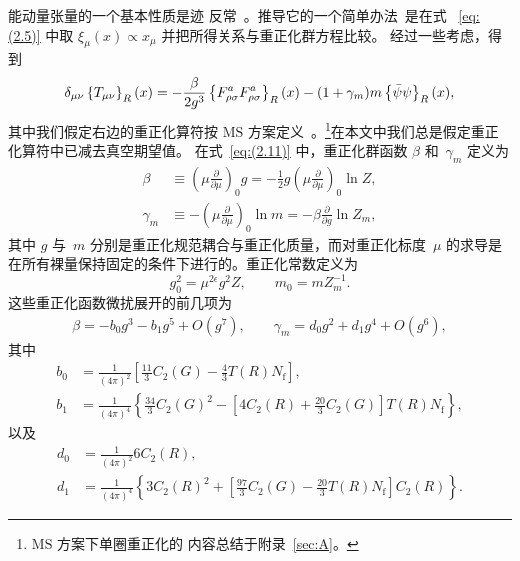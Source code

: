 能动量张量的一个基本性质是迹
反常~\cite{Crewther:1972kn,Chanowitz:1972vd,Adler:1976zt,Nielsen:1977sy,%
Collins:1976yq}。推导它的一个简单办法~\cite{Fujikawa:1980rc,Fujikawa:2004cx}是在式%
~\eqref{eq:(2.5)} 中取 $\xi_\mu(x)\propto x_\mu$ 并把所得关系与重正化群方程比较。
经过一些考虑，得到
\begin{equation}
   \delta_{\mu\nu}
   \left\{T_{\mu\nu}\right\}_R(x)
   =-\frac{\beta}{2g^3}\left\{F_{\rho\sigma}^aF_{\rho\sigma}^a\right\}_R(x)
   -(1+\gamma_m)m\left\{\Bar\psi\psi\right\}_R(x),
\label{eq:(2.11)}
\end{equation}
其中我们假定右边的重正化算符按
$\text{MS}$ 方案定义~\cite{Collins:1984xc}。\footnote{$\text{MS}$ 方案下单圈重正化的
内容总结于附录~\ref{sec:A}。}在本文中我们总是假定重正化算符中已减去真空期望值。
在式~\eqref{eq:(2.11)} 中，重正化群函数 $\beta$ 和~$\gamma_m$ 定义为
\begin{align}
   \beta&\equiv
   \left(\mu\frac{\partial}{\partial\mu}\right)_0g
   =-\frac{1}{2}g\left(\mu\frac{\partial}{\partial\mu}\right)_0\ln Z,
\label{eq:(2.12)}\\
   \gamma_m&\equiv
   -\left(\mu\frac{\partial}{\partial\mu}\right)_0\ln m
   =-\beta\frac{\partial}{\partial g}\ln Z_m,
\label{eq:(2.13)}
\end{align}
其中 $g$ 与~$m$ 分别是重正化规范耦合与重正化质量，而对重正化标度~$\mu$
的求导是在所有裸量保持固定的条件下进行的。重正化常数定义为
\begin{equation}
   g_0^2=\mu^{2\epsilon}g^2Z,\qquad m_0=mZ_m^{-1}.
\label{eq:(2.14)}
\end{equation}
这些重正化函数微扰展开的前几项为
\begin{align}
   \beta=-b_0g^3-b_1g^5+O(g^7),\qquad\gamma_m=d_0g^2+d_1g^4+O(g^6),
\label{eq:(2.15)}
\end{align}
其中~\cite{Caswell:1974gg,Jones:1974mm}
\begin{align}
   b_0&=\frac{1}{(4\pi)^2}
   \left[\frac{11}{3}C_2(G)-\frac{4}{3}T(R)N_{\mathrm{f}}\right],
\label{eq:(2.16)}\\
   b_1&=\frac{1}{(4\pi)^4}
   \left\{
   \frac{34}{3}C_2(G)^2-\left[4C_2(R)+\frac{20}{3}C_2(G)\right]T(R)N_{\mathrm{f}}
   \right\},
\label{eq:(2.17)}
\end{align}
以及~\cite{Tarrach:1980up,Nachtmann:1981zg}
\begin{align}
   d_0&=\frac{1}{(4\pi)^2}6C_2(R),
\label{eq:(2.18)}\\
   d_1&=\frac{1}{(4\pi)^4}
   \left\{
   3C_2(R)^2
   +\left[\frac{97}{3}C_2(G)-\frac{20}{3}T(R)N_{\mathrm{f}}\right]C_2(R)
   \right\}.
\label{eq:(2.19)}
\end{align}
